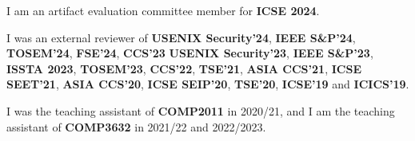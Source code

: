  






I am an artifact evaluation committee member for \textbf{ICSE 2024}.

I was an external reviewer of \textbf{USENIX Security'24}, \textbf{IEEE S\&P'24}, \textbf{TOSEM'24}, \textbf{FSE'24}, \textbf{CCS'23} \textbf{USENIX Security'23}, \textbf{IEEE S\&P'23}, \textbf{ISSTA 2023}, \textbf{TOSEM'23}, \textbf{CCS'22}, \textbf{TSE'21}, \textbf{ASIA CCS'21}, \textbf{ICSE SEET'21}, \textbf{ASIA CCS'20}, \textbf{ICSE SEIP'20}, \textbf{TSE'20}, \textbf{ICSE'19} and \textbf{ICICS'19}.

I was the teaching assistant of \textbf{COMP2011} in 2020/21, and I am the teaching assistant of \textbf{COMP3632} in 2021/22 and 2022/2023.

